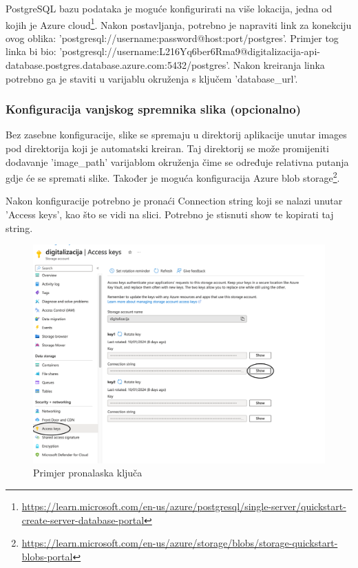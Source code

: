			{PostgreSQL bazu podataka je moguće konfigurirati na više lokacija, jedna od kojih je Azure cloud\footnote{\url{https://learn.microsoft.com/en-us/azure/postgresql/single-server/quickstart-create-server-database-portal}}. Nakon postavljanja, potrebno je napraviti link za konekciju ovog oblika: 'postgresql://{username}:{password}@{host}:{port}/postgres'. Primjer tog linka bi bio: 'postgresql://username:L216Yq6ber6Rma9@digitalizacija-api-database.postgres.database.azure.com:5432/postgres'. Nakon kreiranja linka potrebno ga je staviti u varijablu okruženja s ključem 'database\_url'.}
			
			
			\subsubsection{Konfiguracija vanjskog spremnika slika (opcionalno)}
			
			{Bez zasebne konfiguracije, slike se spremaju u direktorij aplikacije unutar images pod direktorija koji je automatski kreiran. Taj direktorij se može promijeniti dodavanje 'image\_path' varijablom okruženja čime se određuje relativna putanja gdje će se spremati slike. Također je moguća konfiguracija Azure blob storage\footnote{\url{https://learn.microsoft.com/en-us/azure/storage/blobs/storage-quickstart-blobs-portal}}.}
			
			{Nakon konfiguracije potrebno je pronaći Connection string koji se nalazi unutar 'Access keys', kao što se vidi na slici. Potrebno je stisnuti show te kopirati taj string.}
			
			\begin{figure}[H]
				\includegraphics[width=\textwidth]{slike/accessKey.png}
				\caption{Primjer pronalaska ključa}
				\label{fig:accessKey}
			\end{figure}
			

